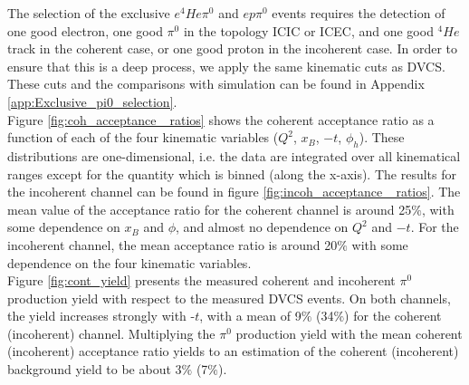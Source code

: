 The selection of the exclusive $e^{4}He\pi^{0}$ and $ep\pi^{0}$ events requires 
the detection of one good electron, one good $\pi^{0}$ in the topology ICIC or 
ICEC, and one good $^{4}He$ track in the coherent case, or one good proton in 
the incoherent case. In order to ensure that this is a deep process, we apply 
the same kinematic cuts as DVCS. These cuts and the comparisons with simulation 
can be found in Appendix \ref{app:Exclusive_pi0_selection}.\\


Figure \ref{fig:coh_acceptance _ratios} shows the coherent acceptance ratio as 
a function of each of the four kinematic variables ($Q^{2}$, $x_{B}$, $-t$, 
$\phi_{h}$). These distributions are one-dimensional, i.e. the data are 
integrated over all kinematical ranges except for the quantity which is binned 
(along the x-axis). The results for the incoherent channel can be found in 
figure \ref{fig:incoh_acceptance _ratios}. The mean value of the acceptance 
ratio for the coherent channel is around 25$\%$, with some dependence on 
$x_{B}$ and $\phi$, and almost no dependence on $Q^{2}$ and $-t$. For the 
incoherent channel, the mean acceptance ratio is around 20$\%$ with some 
dependence on the four kinematic variables.\\

Figure \ref{fig:cont_yield} presents the measured coherent and incoherent 
$\pi^{0}$ production yield with respect to the measured DVCS events. On both 
channels, the yield increases strongly with -$t$, with a mean of 9$\%$ (34$\%$) 
for the coherent (incoherent) channel. Multiplying the $\pi^{0}$ production 
yield with the mean coherent (incoherent) acceptance ratio yields to an 
estimation of the coherent (incoherent) background yield to be about 3$\%$ 
(7$\%$).\\


